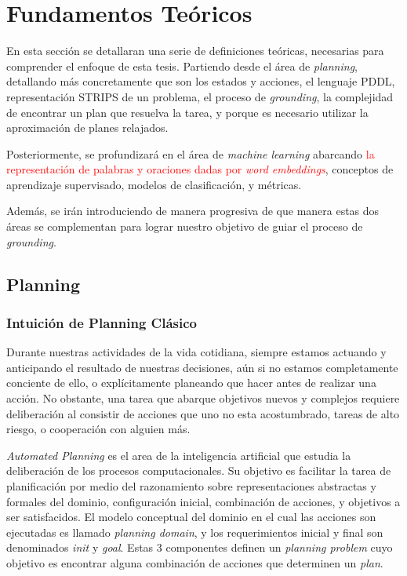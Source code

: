 \chapter{Fundamentos Teóricos}
\label{ch:lit_rev}

En esta sección se detallaran una serie de definiciones teóricas, necesarias
para comprender el enfoque de esta tesis. Partiendo desde el área de
\emph{planning}, detallando más concretamente que son los estados y acciones, el
lenguaje PDDL, representación STRIPS de un problema, el proceso de
\emph{grounding}, la complejidad de encontrar un plan que resuelva la tarea, y
porque es necesario utilizar la aproximación de planes relajados.

Posteriormente, se profundizará en el área de \emph{machine learning} abarcando
\textcolor{red}{la representación de palabras y oraciones dadas por \emph{word
embeddings}}, conceptos de aprendizaje supervisado, modelos de clasificación, y
métricas.

Además, se irán introduciendo de manera progresiva de que manera estas dos áreas
se complementan para lograr nuestro objetivo de guiar el proceso de
\emph{grounding}.

\section{Planning}

\subsection{Intuición de Planning Clásico}

Durante nuestras actividades de la vida cotidiana, siempre estamos actuando y
anticipando el resultado de nuestras decisiones, aún si no estamos completamente
conciente de ello, o explícitamente planeando que hacer antes de realizar una
acción. No obstante, una tarea que abarque objetivos nuevos y complejos requiere
deliberación al consistir de acciones que uno no esta acostumbrado, tareas de
alto riesgo, o cooperación con alguien más.
\citep{Nau-Ghallab-Malik-Traverso-2004}

\emph{Automated Planning} es el area de la inteligencia artificial que estudia
la deliberación de los procesos computacionales. Su objetivo es facilitar la
tarea de planificación por medio del razonamiento sobre representaciones
abstractas y formales del dominio, configuración inicial, combinación de
acciones, y objetivos a ser satisfacidos. El modelo conceptual del dominio en el
cual las acciones son ejecutadas es llamado \emph{planning domain}, y los
requerimientos inicial y final son denominados \emph{init} y \emph{goal}. Estas
3 componentes definen un \emph{planning problem} cuyo objetivo es encontrar
alguna combinación de acciones que determinen un \emph{plan}.


